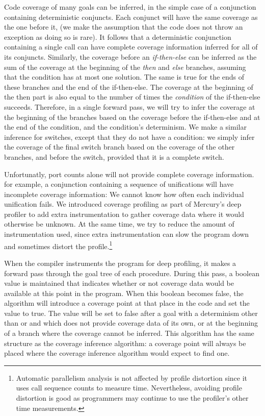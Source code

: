 Code coverage of many goals can be inferred,
in the simple case of a conjunction containing deterministic conjuncts.
Each conjunct will have the same coverage as the one before it,
(we make the assumption that the code does not throw an exception
as doing so is rare).
It follows that a deterministic conjunction containing a single call
can have complete coverage information inferred for all of its conjuncts.
Similarly,
the coverage before an \emph{if-then-else} can be inferred as the sum
of the coverage at the beginning of the \emph{then} and \emph{else}
branches,
assuming that the condition has at most one solution.
The same is true for the ends of these branches and the end of the
if-then-else.
The coverage at the beginning of the then part is also equal to the
number of times the \emph{condition} of the if-then-else succeeds.
Therefore,
in a single forward pass,
we will try to infer the coverage at the beginning of the branches
based on the coverage before the if-then-else and at the end of the
condition,
and the condition's determinism.
We make a similar inference for switches,
except that they do not have a condition:
we simply infer the
coverage of the final switch branch based on the coverage of the other
branches,
and before the switch,
provided that it is a complete switch.

Unfortunatly, port counts alone will not provide complete coverage
information.
for example, a conjunction containing a sequence of \dsemidet
unifications will have incomplete coverage information:
We cannot know how often each individual unification fails.
We introduced coverage profiling as part of Mercury's deep profiler to
add extra instrumentation to gather coverage data where it would
otherwise be unknown.
At the same time, we try to reduce the amount of instrumentation used,
since extra instrumentation can slow the program down and sometimes distort
the profile.\footnote{
    Automatic parallelism analysis is not affected by profile distortion
    since it uses call sequence counts to measure time.
    Nevertheless,
    avoiding profile distortion is good as
    programmers may continue to use the profiler's other
    time measurements.}

When the compiler instruments the program for deep profiling,
it makes a forward pass through the goal tree of each procedure.
During this pass,
a boolean value is maintained that indicates whether or not coverage
data would be available at this point in the program.
When this boolean becomes false,
the algorithm will introduce a coverage point at that place in the code
and set the value to true.
The value will be set to false after a goal with a determinism other than
\ddet or \dccmulti and which does not provide coverage data of its own,
or at the beginning of a branch where the coverage cannot be inferred.
This algorithm has the same structure as the coverage inference
algorithm:
a coverage point will always be placed where the coverage inference
algorithm would expect to find one.

